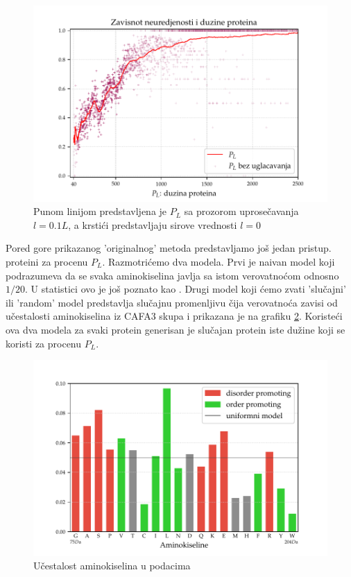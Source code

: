 \begin{figure}[th]
\centering
\includegraphics[]{../plots/PL_F}
\decoRule
\caption {
 Punom linijom predstavljena je $P_L$ sa prozorom uprosečavanja $l = 0.1L$,
 a krstići predstavljaju sirove vrednosti $l = 0$ 
}
\label{fig:PL1}
\end{figure}


Pored gore prikazanog 'originalnog' metoda predstavljamo još jedan pristup.
  proteini za procenu $P_L$.
Razmotrićemo dva modela. Prvi je naivan model 
koji podrazumeva da se svaka aminokiselina javlja sa istom verovatnoćom odnosno
$1/20$. U statistici ovo je još poznato kao .  Drugi
model koji ćemo zvati 'slučajni' ili 'random' model predstavlja slučajnu
promenljivu čija verovatnoća zavisi od učestalosti aminokiselina iz CAFA3 skupa
i prikazana je na grafiku \ref{fig:AK_ucestalost}.  Koristeći ova dva modela za
svaki protein generisan je slučajan protein iste dužine koji se koristi za
procenu $P_L$.


\begin{figure}[th]
\centering
\includegraphics[]{../plots/AK_ucestalost}
\decoRule
\caption{Učestalost aminokiselina u podacima}
\label{fig:AK_ucestalost}
\end{figure}



